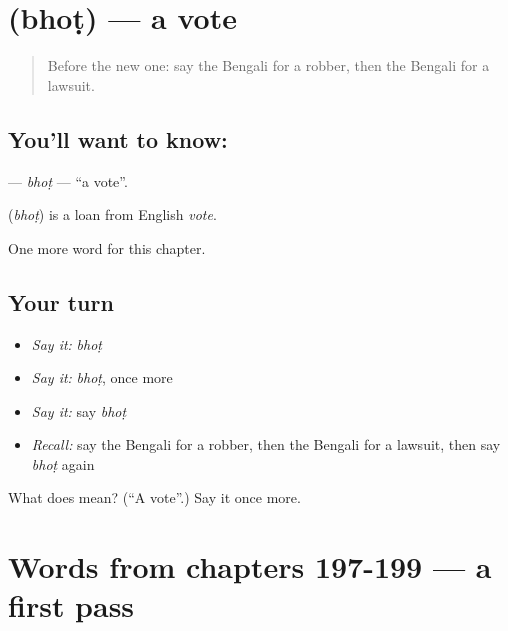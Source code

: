 \section[\texorpdfstring{\bn{ভোট} (bhoṭ)}{ভোট (bhoṭ)}]{ (bhoṭ) — a vote}

\label{lesson:BN-C202-bhot}



\begin{quote}
Before the new one: say the Bengali for a robber, then the Bengali for a lawsuit.
\end{quote}

\subsection*{You'll want to know: }
\textbf{} — \emph{bhoṭ} — \textquotedblleft{}a vote\textquotedblright{}.

\begin{cousinweb}
\textbf{} (\emph{bhoṭ}) is a loan from English \emph{vote}.
\end{cousinweb}

\begin{grammarlens}[title={What you've built}]
One more word for this chapter.
\end{grammarlens}

\subsection*{Your turn}
\begin{itemize}
\raggedright
  \item \emph{Say it:} \emph{bhoṭ}
  \item \emph{Say it:} \emph{bhoṭ}, once more
  \item \emph{Say it:} say \emph{bhoṭ}
  \item \emph{Recall:} say the Bengali for a robber, then the Bengali for a lawsuit, then say \emph{bhoṭ} again
\end{itemize}

\begin{tcolorbox}[breakable,colback=teal!4,colframe=teal!35!black,title={Before you move on}]
What does  mean? (\textquotedblleft{}A vote\textquotedblright{}.) Say it once more.
\end{tcolorbox}
\section[(dialogue)]{Words from chapters 197-199 — a first pass}

